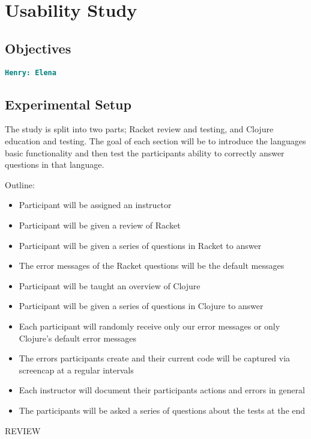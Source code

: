 \documentclass[12pt]{article}
\newcommand{\comment}[1]{{\bf \tt  {#1}}}
\newcommand{\hfcomment}[1]{\textcolor{Teal}{\comment{Henry: {#1}}}}
\begin{document}
\section{Usability Study}\label{sec:study}
	\subsection{Objectives}\label{sec:obj}
	\hfcomment{Elena}
	\subsection{Experimental Setup}\label{sec:setup}

The study is split into two parts; Racket review and testing, and Clojure education and testing.
The goal of each section will be to introduce the languages basic functionality and then test the participants ability to correctly answer questions in that language.

Outline:
\begin{itemize}
\item Participant will be assigned an instructor
\item Participant will be given a review of Racket
\item Participant will be given a series of questions in Racket to answer
\item The error messages of the Racket questions will be the default messages
\item Participant will be taught an overview of Clojure
\item Participant will be given a series of questions in Clojure to answer
\item Each participant will randomly receive only our error messages or  only Clojure's default error messages
\item The errors participants create and their current code will be captured via screencap at a regular intervals
\item Each instructor will document their participants actions and errors in general
\item The participants will be asked a series of questions about the tests at the end
\end{itemize}

REVIEW
\end{document}
